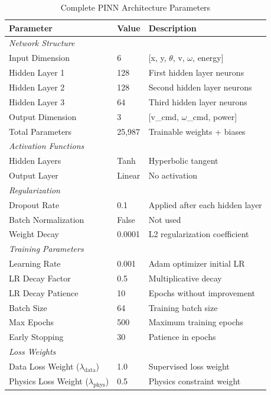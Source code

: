\begin{table}[htbp]
\centering
\caption{Complete PINN Architecture Parameters}
\label{tab:pinn_architecture}
\begin{tabular}{@{}lll@{}}
\toprule
\textbf{Parameter} & \textbf{Value} & \textbf{Description} \\
\midrule
\multicolumn{3}{l}{\textit{Network Structure}} \\
Input Dimension & 6 & [x, y, $\theta$, v, $\omega$, energy] \\
Hidden Layer 1 & 128 & First hidden layer neurons \\
Hidden Layer 2 & 128 & Second hidden layer neurons \\
Hidden Layer 3 & 64 & Third hidden layer neurons \\
Output Dimension & 3 & [v\_cmd, $\omega$\_cmd, power] \\
Total Parameters & 25,987 & Trainable weights + biases \\
\midrule
\multicolumn{3}{l}{\textit{Activation Functions}} \\
Hidden Layers & Tanh & Hyperbolic tangent \\
Output Layer & Linear & No activation \\
\midrule
\multicolumn{3}{l}{\textit{Regularization}} \\
Dropout Rate & 0.1 & Applied after each hidden layer \\
Batch Normalization & False & Not used \\
Weight Decay & 0.0001 & L2 regularization coefficient \\
\midrule
\multicolumn{3}{l}{\textit{Training Parameters}} \\
Learning Rate & 0.001 & Adam optimizer initial LR \\
LR Decay Factor & 0.5 & Multiplicative decay \\
LR Decay Patience & 10 & Epochs without improvement \\
Batch Size & 64 & Training batch size \\
Max Epochs & 500 & Maximum training epochs \\
Early Stopping & 30 & Patience in epochs \\
\midrule
\multicolumn{3}{l}{\textit{Loss Weights}} \\
Data Loss Weight ($\lambda_{\text{data}}$) & 1.0 & Supervised loss weight \\
Physics Loss Weight ($\lambda_{\text{phys}}$) & 0.5 & Physics constraint weight \\

\end{tabular}
\end{table}
